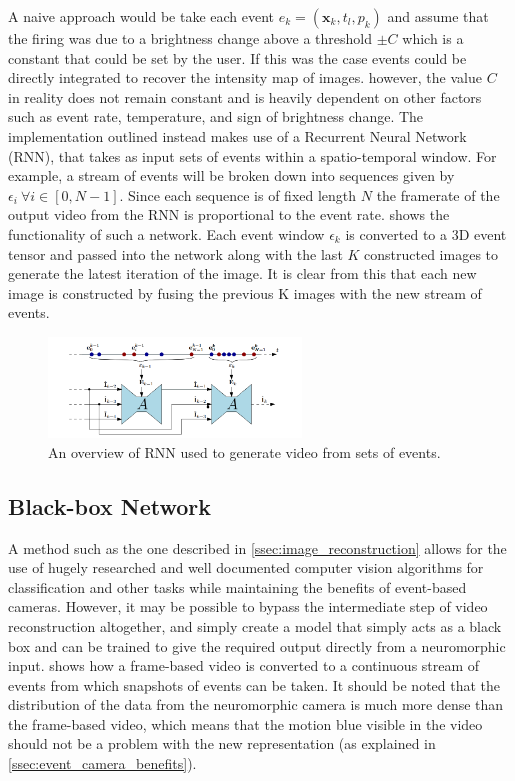 A naive approach would be take each event $ e_k = (\boldsymbol{\mathbf{x}}_k, t_l, p_k ) $ and assume that the firing was due to a brightness change above a threshold $ \pm C $ which is a constant that could be set by the user. If this was the case events could be directly integrated to recover the intensity map of images. however, the value $ C $ in reality does not remain constant and is heavily dependent on other factors such as event rate, temperature, and sign of brightness change. The implementation outlined instead makes use of a Recurrent Neural Network (RNN), that takes as input sets of events within a spatio-temporal window. For example, a stream of events will be broken down into sequences given by $ \epsilon_i \: \forall i \in [0, N-1] $. Since each sequence is of fixed length $ N $ the framerate of the output video from the RNN is proportional to the event rate.  shows the functionality of such a network. Each event window $ \epsilon_k $ is converted to a 3D event tensor and passed into the network along with the last $ K $ constructed images to generate the latest iteration of the image. It is clear from this that each new image is constructed by fusing the previous K images with the new stream of events.

\begin{figure}[htb]
      \centering
      \includegraphics[width=0.6\textwidth]{background/images/spikes_to_video_rnn.png}
      \caption{An overview of RNN used to generate video from sets of events\cite{spikingToVideo}.}
      \label{fig:spikes_to_video_rnn}
\end{figure}

\subsection{Black-box Network}

A method such as the one described in \cref{ssec:image_reconstruction} allows for the use of hugely researched and well documented computer vision algorithms for classification and other tasks while maintaining the benefits of event-based cameras. However, it may be possible to bypass the intermediate step of video reconstruction altogether, and simply create a model that simply acts as a black box and can be trained to give the required output directly from a neuromorphic input.  shows how a frame-based video is converted to a continuous stream of events from which snapshots of events can be taken. It should be noted that the distribution of the data from the neuromorphic camera is much more dense than the frame-based video, which means that the motion blue visible in the video should not be a problem with the new representation (as explained in \cref{ssec:event_camera_benefits}).


